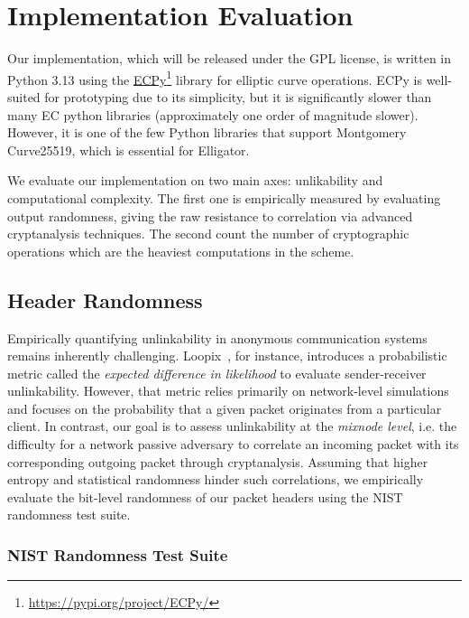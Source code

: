 \section{Implementation Evaluation}\label{sec:evaluation}

Our implementation, which will be released under the GPL license, is written in Python 3.13 using the \href{https://pypi.org/project/ECPy/}{ECPy}\footnote{\url{https://pypi.org/project/ECPy/}} library for elliptic curve operations.
ECPy is well-suited for prototyping due to its simplicity, but it is significantly slower than many EC python libraries (approximately one order of magnitude slower). 
However, it is one of the few Python libraries that support Montgomery Curve25519, which is essential for Elligator.

We evaluate our implementation on two main axes: unlikability and computational complexity.
The first one is empirically measured by evaluating output randomness, giving the raw resistance to correlation via advanced cryptanalysis techniques.
The second count the number of cryptographic operations which are the heaviest computations in the scheme.


\subsection{Header Randomness}\label{sec:output_randomness}

Empirically quantifying unlinkability in anonymous communication systems remains inherently challenging.
Loopix~\cite{piotrowska2017loopix}, for instance, introduces a probabilistic metric called the \emph{expected difference in likelihood} to evaluate sender-receiver unlinkability.
However, that metric relies primarily on network-level simulations and focuses on the probability that a given packet originates from a particular client.
In contrast, our goal is to assess unlinkability at the \emph{mixnode level}, i.e. the difficulty for a network passive adversary to correlate an incoming packet with its corresponding outgoing packet through cryptanalysis.
Assuming that higher entropy and statistical randomness hinder such correlations, we empirically evaluate the bit-level randomness of our packet headers using the NIST randomness test suite.

\subsubsection{NIST Randomness Test Suite}\label{sec:NIST}

